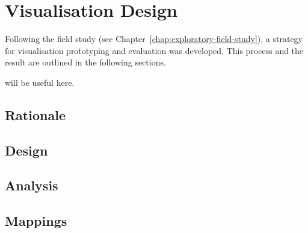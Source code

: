 
\chapter{Visualisation Design}
\label{chap:visualisation-design}

Following the field study (see Chapter~\ref{chap:exploratory-field-study}), a strategy for visualisation prototyping and evaluation was developed. This process and the result are outlined in the following sections.

{\color{red}\cite{Ware2013a,McLean2010a,Purchase1996} will be useful here.}

\section{Rationale}



\section{Design}

\section{Analysis}

\section{Mappings}